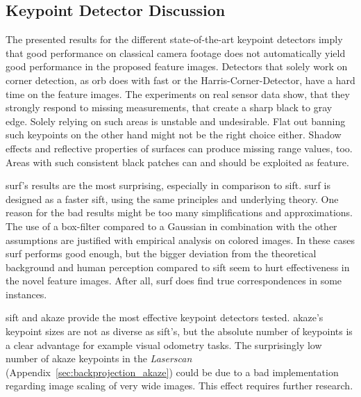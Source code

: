 \subsection{Keypoint Detector Discussion}

The presented results for the different state-of-the-art keypoint detectors imply that good performance on classical camera footage does not automatically yield good performance in the proposed feature images.
Detectors that solely work on corner detection, as \acrshort{orb} does with \acrshort{fast} or the Harris-Corner-Detector, have a hard time on the feature images.
The experiments on real sensor data show, that they strongly respond to missing measurements, that create a sharp black to gray edge.
Solely relying on such areas is unstable and undesirable.
Flat out banning such keypoints on the other hand might not be the right choice either.
Shadow effects and reflective properties of surfaces can produce missing range values, too.
Areas with such consistent black patches can and should be exploited as feature.

\acrshort{surf}'s results are the most surprising, especially in comparison to \acrshort{sift}.
\acrshort{surf} is designed as a faster \acrshort{sift}, using the same principles and underlying theory.
One reason for the bad results might be too many simplifications and approximations.
The use of a box-filter compared to a Gaussian in combination with the other assumptions are justified with empirical analysis on colored images.
In these cases \acrshort{surf} performs good enough, but the bigger deviation from the theoretical background and human perception compared to \acrshort{sift} seem to hurt effectiveness in the novel feature images.
After all, \acrshort{surf} does find true correspondences in some instances.

\acrshort{sift} and \acrshort{akaze} provide the most effective keypoint detectors tested.
\acrshort{akaze}'s keypoint sizes are not as diverse as \acrshort{sift}'s, but the absolute number of keypoints is a clear advantage for example visual odometry tasks.
The surprisingly low number of \acrshort{akaze} keypoints in the \emph{Laserscan} (Appendix~\ref{sec:backprojection_akaze}) could be due to a bad implementation regarding image scaling of very wide images.
This effect requires further research.
